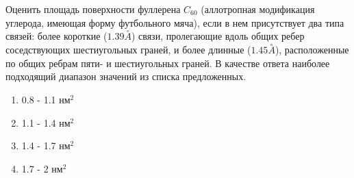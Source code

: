 
Оценить
площадь поверхности фуллерена $C_{60}$ (аллотропная модификация углерода, имеющая
форму футбольного мяча), если в нем присутствует два типа связей: более
короткие ($1.39 \stackrel{\circ}{A}$) связи, пролегающие вдоль общих ребер соседствующих
шестиугольных граней, и более длинные ($1.45 \stackrel{\circ}{A}$), расположенные по общих ребрам
пяти- и шестиугольных граней. В качестве ответа наиболее подходящий диапазон значений из списка
предложенных.

\begin{enumerate}
    \item 0.8 - 1.1 нм$^2$
    \item 1.1 - 1.4 нм$^2$
    \item 1.4 - 1.7 нм$^2$
    \item 1.7 - 2 нм$^2$
\end{enumerate}



